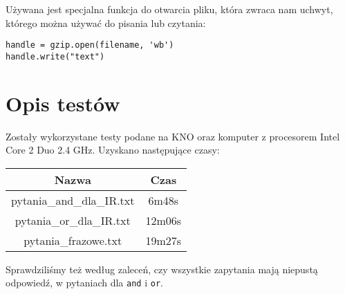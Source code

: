 \documentclass[11pt]{article}
\begin{document}
Używana jest specjalna funkcja do otwarcia pliku, która zwraca nam uchwyt, którego można używać do pisania lub czytania:
\begin{verbatim}
handle = gzip.open(filename, 'wb') 
handle.write("text")
\end{verbatim}

\section{Opis testów}
Zostały wykorzystane testy podane na KNO oraz komputer z procesorem Intel Core 2 Duo 2.4 GHz. Uzyskano następujące czasy:
\begin{center}
\begin{tabular}{|c|c|}
\hline
Nazwa & Czas \\ \hline
pytania\_and\_dla\_IR.txt & 6m48s \\ \hline
pytania\_or\_dla\_IR.txt & 12m06s \\ \hline
pytania\_frazowe.txt & 19m27s \\ \hline
\end{tabular}
\end{center}

Sprawdziliśmy też według zaleceń, czy wszystkie zapytania mają niepustą odpowiedź, w pytaniach dla \texttt{and} i \texttt{or}.
\end{document}
